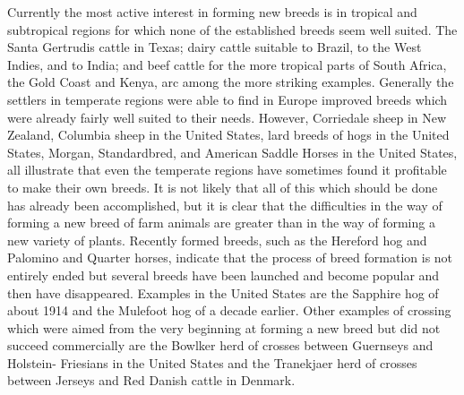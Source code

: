 Currently the most active interest in forming new breeds is in tropical
and subtropical regions for which none of the established breeds
seem well suited. The Santa Gertrudis cattle in Texas; dairy cattle
suitable to Brazil, to the West Indies, and to India; and beef cattle for
the more tropical parts of South Africa, the Gold Coast and Kenya, arc
among the more striking examples. Generally the settlers in temperate
regions were able to find in Europe improved breeds which were
already fairly well suited to their needs. However, Corriedale sheep in
New Zealand, Columbia sheep in the United States, lard breeds of hogs
in the United States, Morgan, Standardbred, and American Saddle
Horses in the United States, all illustrate that even the temperate
regions have sometimes found it profitable to make their own breeds.
It is not likely that all of this which should be done has already been
accomplished, but it is clear that the difficulties in the way of forming a
new breed of farm animals are greater than in the way of forming a new
variety of plants. Recently formed breeds, such as the Hereford hog
and Palomino and Quarter horses, indicate that the process of breed
formation is not entirely ended but several breeds have been launched
and become popular and then have disappeared. Examples in the
United States are the Sapphire hog of about 1914 and the Mulefoot hog
of a decade earlier. Other examples of crossing which were aimed from
the very beginning at forming a new breed but did not succeed commercially
are the Bowlker herd of crosses between Guernseys and Holstein-
Friesians in the United States and the Tranekjaer herd of crosses
between Jerseys and Red Danish cattle in Denmark.
\noclub[3]

